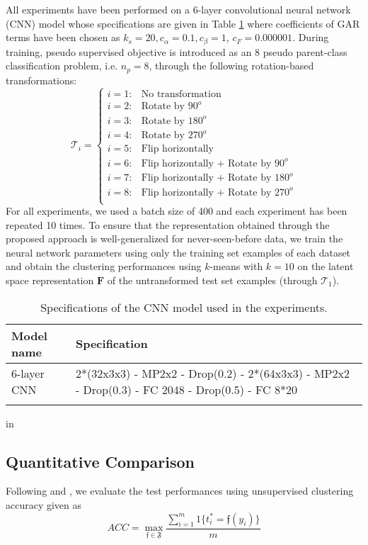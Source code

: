 \documentclass{article} \usepackage{iclr2018_conference,times}
\newcommand{\ra}[1]{\renewcommand{\arraystretch}{#1}}
\begin{document}
All experiments have been performed on a 6-layer convolutional neural network (CNN) model whose specifications are given in Table \ref{tab:pseudo_models} where coefficients of GAR terms have been chosen as $k_s=20, c_\alpha=0.1, c_\beta=1$, $c_F=0.000001$. During training, pseudo supervised objective is introduced as an 8 pseudo parent-class classification problem, i.e. $n_p=8$, through the following rotation-based transformations:
\begin{equation}
\label{eq:pseudo_transformations}
\mathcal{T}_i =
\begin{cases}
i=1: & \text{No transformation} \\ 
i=2: & \text{Rotate by $90^o$} \\
i=3: & \text{Rotate by $180^o$} \\
i=4: & \text{Rotate by $270^o$} \\ 
i=5: & \text{Flip horizontally} \\
i=6: & \text{Flip horizontally + Rotate by $90^o$} \\
i=7: & \text{Flip horizontally + Rotate by $180^o$} \\
i=8: & \text{Flip horizontally + Rotate by $270^o$} \\
\end{cases}
\end{equation}
For all experiments, we used a batch size of 400 and each experiment has been repeated 10 times. To ensure that the representation obtained through the proposed approach is well-generalized for never-seen-before data, we train the neural network parameters using only the training set examples of each dataset and obtain the clustering performances using $k$-means with $k=10$ on the latent space representation $\boldsymbol{F}$ of the untransformed test set examples (through $\mathcal{T}_1$).
\begin{table}[h]\centering
\ra{1.2}
\caption{Specifications of the CNN model used in the experiments.}
\resizebox{\columnwidth}{!} {
\begin{tabular}{@{}ll@{}}\toprule
Model name & Specification\\
\midrule
6-layer CNN & 2*(32x3x3) - MP2x2 - Drop(0.2) - 2*(64x3x3) - MP2x2 - Drop(0.3) - FC 2048 - Drop(0.5) - FC 8*20 \\	
\bottomrule
\label{tab:pseudo_models}
\end{tabular}
}
 in
\end{table}

\subsection{Quantitative Comparison}
Following \citet{JiangZTTZ17} and \citet{YangPB16}, we evaluate the test performances using unsupervised clustering accuracy given as
\begin{equation}
\label{ACC}
ACC = \max_{\mathfrak{f}\in \mathfrak{F}}\frac{\sum_{i = 1}^{m}{1\{t^*_i = \mathfrak{f}(y_i)\}}}{m}
\end{equation}
\end{document}
